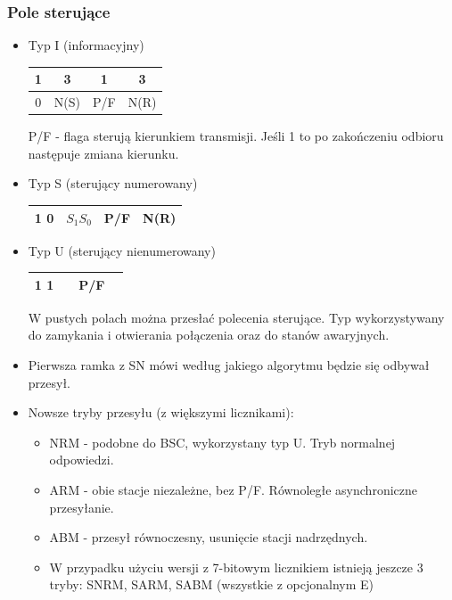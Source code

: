 \documentclass[a4paper,twoside]{article}
\begin{document}
\subsubsection{Pole sterujące}
\begin{itemize}
	\item Typ I (informacyjny)\\
	\begin{table}[h]
		\begin{tabular}{cccc}
			1                       & 3                         & 1                     & 3                         \\ \hline
			\multicolumn{1}{|c|}{0} & \multicolumn{1}{c|}{N(S)} & \multicolumn{1}{c|}{P/F} & \multicolumn{1}{c|}{N(R)} \\ \hline
		\end{tabular}
	\end{table}
	P/F - flaga sterują kierunkiem transmisji. Jeśli 1 to po zakończeniu odbioru następuje zmiana kierunku.
	\item Typ S (sterujący numerowany) \\
	\begin{table}[h]
		\begin{tabular}{cccc} \hline
			\multicolumn{1}{|c|}{1 0} & \multicolumn{1}{c|}{$ S_{1} S_{0} $} & \multicolumn{1}{c|}{P/F} & \multicolumn{1}{c|}{N(R)} \\ \hline
		\end{tabular}
	\end{table}
	\item Typ U (sterujący nienumerowany)\\
	\begin{table}[h]
		\begin{tabular}{cccc} \hline
			\multicolumn{1}{|c|}{1 1} & \multicolumn{1}{c|}{} & \multicolumn{1}{c|}{P/F} & \multicolumn{1}{c|}{} \\ \hline
		\end{tabular}
	\end{table}
	W pustych polach można przesłać polecenia sterujące. Typ wykorzystywany do zamykania i otwierania połączenia oraz do stanów awaryjnych.
	\item Pierwsza ramka z SN mówi według jakiego algorytmu będzie się odbywał przesył.\\
	\item Nowsze tryby przesyłu (z większymi licznikami):
	\begin{itemize}
		\item NRM - podobne do BSC, wykorzystany typ U. Tryb normalnej odpowiedzi.
		\item ARM - obie stacje niezależne, bez P/F. Równoległe asynchroniczne przesyłanie.
		\item ABM - przesył równoczesny, usunięcie stacji nadrzędnych.
		\item W przypadku użyciu wersji z 7-bitowym licznikiem istnieją jeszcze 3 tryby: SNRM, SARM, SABM (wszystkie z opcjonalnym E)
	\end{itemize}
\end{itemize}
\end{document}
